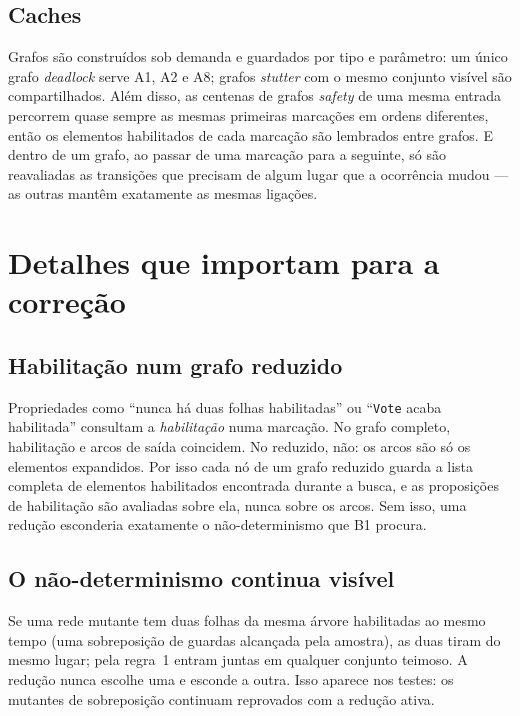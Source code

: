 \documentclass[11pt,a4paper]{report}
\newcommand{\code}[1]{\texttt{\small #1}}
\theoremstyle{definition}
\begin{document}
\section{Caches}

Grafos são construídos sob demanda e guardados por tipo e parâmetro: um único
grafo \emph{deadlock} serve A1, A2 e A8; grafos \emph{stutter} com o mesmo
conjunto visível são compartilhados. Além disso, as centenas de grafos
\emph{safety} de uma mesma entrada percorrem quase sempre as mesmas primeiras
marcações em ordens diferentes, então os elementos habilitados de cada
marcação são lembrados entre grafos. E dentro de um grafo, ao passar de uma
marcação para a seguinte, só são reavaliadas as transições que precisam de
algum lugar que a ocorrência mudou --- as outras mantêm exatamente as mesmas
ligações.

\chapter{Detalhes que importam para a correção}
\label{cap:detalhes}

\section{Habilitação num grafo reduzido}

Propriedades como ``nunca há duas folhas habilitadas'' ou ``\code{Vote} acaba
habilitada'' consultam a \emph{habilitação} numa marcação. No grafo completo,
habilitação e arcos de saída coincidem. No reduzido, não: os arcos são só os
elementos expandidos. Por isso cada nó de um grafo reduzido guarda a lista
completa de elementos habilitados encontrada durante a busca, e as
proposições de habilitação são avaliadas sobre ela, nunca sobre os arcos. Sem
isso, uma redução esconderia exatamente o não-determinismo que B1 procura.

\section{O não-determinismo continua visível}

Se uma rede mutante tem duas folhas da mesma árvore habilitadas ao mesmo tempo
(uma sobreposição de guardas alcançada pela amostra), as duas tiram do mesmo
lugar; pela regra~1 entram juntas em qualquer conjunto teimoso. A redução
nunca escolhe uma e esconde a outra. Isso aparece nos testes: os mutantes de
sobreposição continuam reprovados com a redução ativa.
\end{document}
